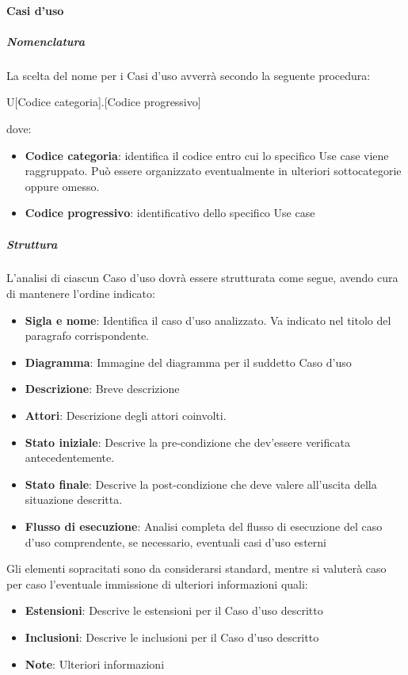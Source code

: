 \paragraph{Casi d'uso}
\subparagraph{Nomenclatura}
La scelta del nome per i Casi d'uso avverrà secondo la seguente procedura:
\begin{center}
	U[Codice categoria].[Codice progressivo]
\end{center}
dove:
\begin{itemize}
	\item\textbf{Codice categoria}: identifica il codice entro cui lo specifico Use case viene raggruppato. Può essere organizzato eventualmente in ulteriori sottocategorie oppure omesso.
	\item\textbf{Codice progressivo}: identificativo dello specifico Use case
\end{itemize}

\subparagraph{Struttura}
L'analisi di ciascun Caso d'uso dovrà essere strutturata come segue, avendo cura di mantenere l'ordine indicato:

\begin{itemize}
	\item\textbf{Sigla e nome}: Identifica il caso d'uso analizzato. Va indicato nel titolo del paragrafo corrispondente.
	\item\textbf{Diagramma}: Immagine del diagramma per il suddetto Caso d'uso
	\item\textbf{Descrizione}: Breve descrizione
	\item\textbf{Attori}: Descrizione degli attori coinvolti.
	
	\item\textbf{Stato iniziale}: Descrive la pre-condizione che dev'essere verificata antecedentemente.
	\item\textbf{Stato finale}: Descrive la post-condizione che deve valere all'uscita della situazione descritta.
	\item\textbf{Flusso di esecuzione}: Analisi completa del flusso di esecuzione del caso d'uso comprendente,  se necessario, eventuali casi d'uso esterni
\end{itemize}

Gli elementi sopracitati sono da considerarsi standard, mentre si valuterà caso per caso l'eventuale immissione di ulteriori informazioni quali:

\begin{itemize}
	\item\textbf{Estensioni}: Descrive le estensioni per il Caso d'uso descritto
	\item\textbf{Inclusioni}: Descrive le inclusioni per il Caso d'uso descritto
	\item\textbf{Note}: Ulteriori informazioni
\end{itemize}

